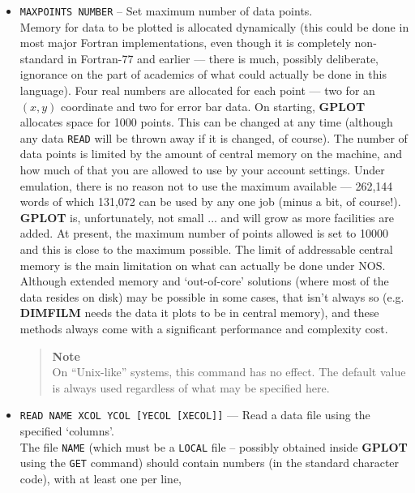 \documentclass[a4paper,twoside,11pt]{article}
\newcommand{\textttc}[1]{\texttt{\textcolor{OurRed}{#1}}}
\begin{document}
\begin{itemize}
\item \textttc{MAXPOINTS NUMBER} -- Set maximum number of data points.\\ 
   Memory for data to be plotted is allocated dynamically (this could be
   done in most major Fortran implementations, even though it is completely non-standard
   in Fortran-77 and earlier --- there is much, possibly deliberate, ignorance on the part
   of academics of what could actually be done in this language). Four real numbers are allocated
   for each point --- two for an $(x,y)$ coordinate and two for error bar data. On starting,
   \textbf{GPLOT} allocates space for 1000 points. This can be changed at any time (although any data
   \texttt{READ} will be thrown away if it is changed, of course). The number of data points is limited
   by the amount of central memory on the machine, and how much of that you are allowed to use by
   your account settings. Under emulation, there is no reason not to use the maximum
   available --- 262,144 words of which 131,072 can be used by any one job (minus a bit, of
   course!). \textbf{GPLOT} is, unfortunately, not small ... and will grow as more facilities are
   added. At present, the maximum number of points allowed is set to 10000 and this is close to the
   maximum possible. The limit of addressable central memory is the main limitation on what
   can actually be done under NOS. Although extended memory and `out-of-core' solutions (where
   most of the data resides on disk) may be possible in some cases, that isn't always so (e.g.
   \textbf{DIMFILM} needs the data it plots to be in central memory), and these methods always come
   with a significant performance and complexity cost.
   \begin{quote}
     \begin{center}
       \textbf{Note}\\
       On ``Unix-like'' systems, this command has no effect. The default value is always used
       regardless of what may be specified here.
     \end{center}
   \end{quote}
\item \textttc{READ NAME XCOL YCOL [YECOL [XECOL]]} --- Read a data file using the specified `columns'.\\
   The file \texttt{NAME} (which must be a \texttt{LOCAL} file -- possibly obtained inside \textbf{GPLOT} using
   the \texttt{GET} command) should contain numbers (in the standard character code), with at least one per line,

\end{itemize}
\end{document}
